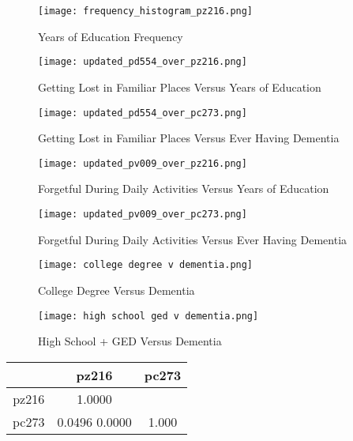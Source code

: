 \documentclass{article}
\begin{document}
\begin{figure}[h!]
    \centering
    \texttt{[image: frequency\_histogram\_pz216.png]}
    \caption{Years of Education Frequency}
    \label{fig:histogram}
\end{figure}

\begin{figure}[H]
    \centering
    \texttt{[image: updated\_pd554\_over\_pz216.png]}
    \caption{Getting Lost in Familiar Places Versus Years of Education}
    \label{fig:get lost/education}
\end{figure}

\begin{figure}[h!]
    \centering
    \texttt{[image: updated\_pd554\_over\_pc273.png]}
    \caption{Getting Lost in Familiar Places Versus Ever Having Dementia}
    \label{fig:get lost/dementia}
\end{figure}

\begin{figure}[h!]
    \centering
    \texttt{[image: updated\_pv009\_over\_pz216.png]}
    \caption{Forgetful During Daily Activities Versus Years of Education}
    \label{fig:forgetful/education}
\end{figure}

\begin{figure}[h!]
    \centering
    \texttt{[image: updated\_pv009\_over\_pc273.png]} \caption{Forgetful During Daily Activities Versus Ever Having Dementia}
    \label{fig:forgetful/dementia}
\end{figure}

\begin{figure}[H]
    \centering
    \texttt{[image: college degree v dementia.png]}
    \caption{College Degree Versus Dementia}
    \label{fig:college/dementia}
\end{figure}

\begin{figure}[H]
    \centering
    \texttt{[image: high school ged v dementia.png]}
    \caption{High School + GED Versus Dementia}
    \label{fig:high school/dementia}
\end{figure}

\begin{center}
\begin{tabular}{ |c|c|c| }
    \hline
  & pz216 & pc273 \\ 
  \hline
 pz216 & 1.0000 &  \\  
 \hline
 pc273 & 0.0496
 0.0000 & 1.000 \\
 \hline 
\end{tabular}
\end{center}
\end{document}
